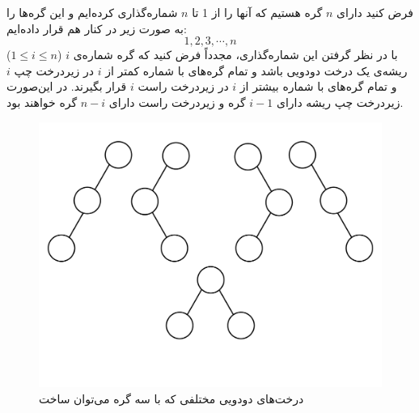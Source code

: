 
فرض کنید دارای {$n$} گره هستیم که آنها را از 1 تا {$n$} شماره‌گذاری کرده‌ایم و این گره‌ها را به صورت زیر در کنار هم قرار داده‌ایم:
$$
1,2,3,\cdots ,n
$$
با در نظر گرفتن این شماره‌گذاری، مجدداً فرض کنید که گره شماره‌ی {$i$} ({$1\leqslant i \leqslant n$}) ریشه‌ی یک درخت دودویی باشد و تمام گره‌های با شماره کمتر از {$i$} در زیردرخت چپ {$i$} و تمام گره‌های با شماره بیشتر از {$i$} در زیردرخت راست {$i$} قرار بگیرند. در این‌صورت زیردرخت چپ ریشه دارای {$i-1$} گره و  زیردرخت راست دارای {$n-i$} گره خواهند بود.

\begin{figure}
\begin{center}
\includegraphics[scale=0.33]{figs/ch5/binary_trees_with_three_nodes.pdf}
\caption{درخت‌های دودویی مختلفی که با سه گره می‌توان ساخت}\label{ch5:fig:3nodesBinTrees}
\end{center}
\end{figure}

